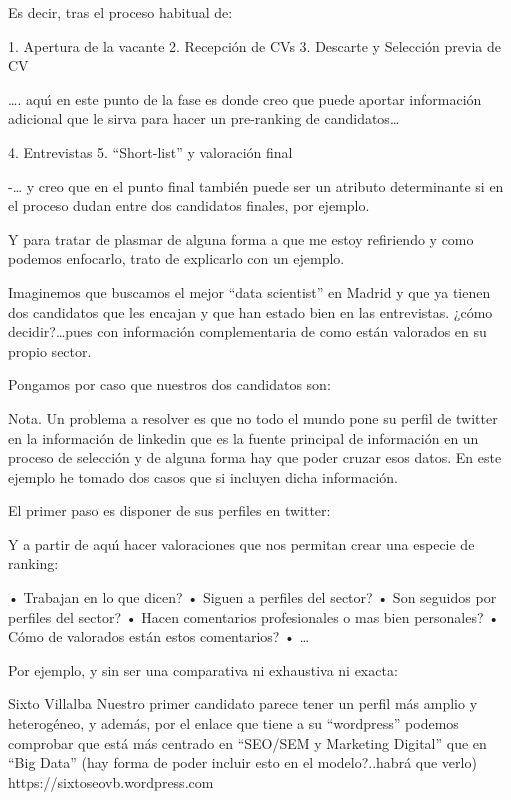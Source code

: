 \documentclass[11pt,a4paper,leqno,titlepage,twoside]{book}
\begin{document}
Es decir, tras el proceso habitual de:

1. Apertura de la vacante
2. Recepci\'on de CVs
3. Descarte y Selecci\'on previa de CV

…. aqu\'{\i} en este punto de la fase es donde creo que puede aportar informaci\'on adicional que le sirva para hacer un 
pre-ranking de candidatos…

4. Entrevistas
5. “Short-list” y valoraci\'on final

-… y creo que en el punto final tambi\'en puede ser un atributo determinante si en el proceso dudan entre dos candidatos 
finales, por ejemplo.

Y para tratar de plasmar de alguna forma a que me estoy refiriendo y como podemos enfocarlo, trato de explicarlo con un ejemplo.

Imaginemos que buscamos el mejor “data scientist” en Madrid y que ya tienen dos candidatos que les encajan y que han estado bien 
en las entrevistas. ¿c\'omo decidir?…pues con informaci\'on complementaria de como est\'an valorados en su propio sector.

Pongamos por caso que nuestros dos candidatos son:

 

Nota. Un problema a resolver es que no todo el mundo pone su perfil de twitter en la informaci\'on de linkedin que es la fuente 
principal de informaci\'on en un proceso de selecci\'on y de alguna forma hay que poder cruzar esos datos. En este ejemplo he 
tomado dos casos que si incluyen dicha informaci\'on.

El primer paso es disponer de sus perfiles en twitter:

 		 

Y a partir de aqu\'{\i} hacer valoraciones que nos permitan crear una especie de ranking:

•	Trabajan en lo que dicen?
•	Siguen a perfiles del sector?
•	Son seguidos por perfiles del sector?
•	Hacen comentarios profesionales o mas bien personales?
•	C\'omo de valorados est\'an estos comentarios?
•	…






Por ejemplo, y sin ser una comparativa ni exhaustiva ni exacta:

Sixto Villalba
Nuestro primer candidato parece tener un perfil m\'as amplio y heterog\'eneo, y adem\'as, por el enlace que tiene a su 
“wordpress” podemos comprobar que est\'a m\'as centrado en “SEO/SEM y Marketing Digital” que en “Big Data” (hay forma de 
poder incluir esto en el modelo?..habr\'a que verlo)
https://sixtoseovb.wordpress.com
\end{document}
